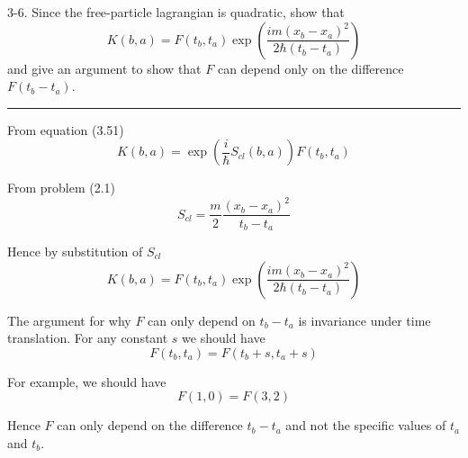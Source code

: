 \documentclass[12pt]{article}
\begin{document}
3-6.
Since the free-particle lagrangian is quadratic, show that
\begin{equation*}
K(b,a)=F(t_b,t_a)\exp\left(\frac{im(x_b-x_a)^2}{2\hbar(t_b-t_a)}\right)
\end{equation*}
and give an argument to show that $F$ can depend only on the difference $F(t_b-t_a)$.

\bigskip
\hrule

\bigskip
From equation (3.51)
\begin{equation*}
K(b,a)=\exp\left(\frac{i}{\hbar}S_{cl}(b,a)\right)F(t_b,t_a)
\end{equation*}

From problem (2.1)
\begin{equation*}
S_{cl}=\frac{m}{2}\frac{(x_b-x_a)^2}{t_b-t_a}
\end{equation*}

Hence by substitution of $S_{cl}$
\begin{equation*}
K(b,a)=F(t_b,t_a)\exp\left(\frac{im(x_b-x_a)^2}{2\hbar(t_b-t_a)}\right)
\end{equation*}

The argument for why $F$ can only depend on $t_b-t_a$ is invariance under time translation.
For any constant $s$ we should have
\begin{equation*}
F(t_b,t_a)=F(t_b+s,t_a+s)
\end{equation*}

For example, we should have
\begin{equation*}
F(1,0)=F(3,2)
\end{equation*}

Hence $F$ can only depend on the difference $t_b-t_a$ and not the specific values of $t_a$ and $t_b$.
\end{document}

